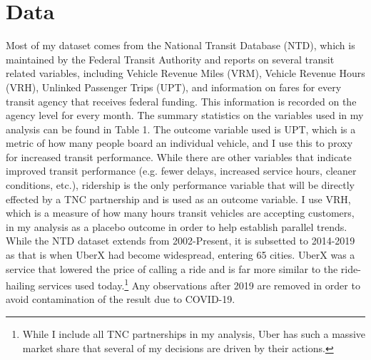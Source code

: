 \documentclass [12pt]{report}
\begin{document}
\section*{Data}
Most of my dataset comes from the National Transit Database (NTD), which  is maintained by the Federal Transit Authority and reports on several transit related variables, including Vehicle Revenue Miles (VRM), Vehicle Revenue Hours (VRH), Unlinked Passenger Trips (UPT), and information on fares for every transit agency that receives federal funding. This information is recorded on the agency level for every month. The summary statistics on the variables used in my analysis can be found in Table 1. The outcome variable used is UPT, which is a metric of how many people board an individual vehicle, and I use this to proxy for increased transit performance. While there are other variables that indicate improved transit performance (e.g. fewer delays, increased service hours, cleaner conditions, etc.), ridership is the only performance variable that will be directly effected by a TNC partnership and is used as an outcome variable. I use VRH, which is a measure of how many hours transit vehicles are accepting customers, in my analysis as a placebo outcome in order to help establish parallel trends. \\
\indent While the NTD dataset extends from 2002-Present, it is subsetted to 2014-2019 as that is when UberX had become widespread, entering 65 cities. UberX was a service that lowered the price of calling a ride and is far more similar to the ride-hailing services used today.\footnote{While I include all TNC partnerships in my analysis, Uber has such a massive market share that several of my decisions are driven by their actions.} Any observations after 2019 are removed in order to avoid contamination of the result due to COVID-19. \\
\end{document}
